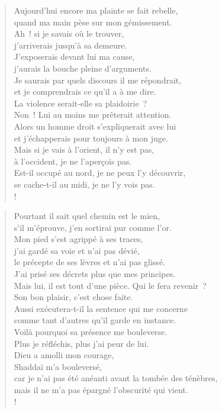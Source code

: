 \documentclass[french,twoside]{book} %
\def\mednobreak{\ifdim\lastskip<\medskipamount
  \removelastskip\nopagebreak\medskip\fi}
\newcommand{\labelblock}[1]{\medbreak{\noindent\color{rubric}\bfseries #1}\par\mednobreak}
\newcommand\chapterclose{} %
\begin{document}
\begin{verse}
Aujourd’hui encore ma plainte se fait rebelle, \\
quand ma main pèse sur mon gémissement.\\
Ah ! si je savais où le trouver, \\
j’arriverais jusqu’à sa demeure.\\
J’exposerais devant lui ma cause, \\
j’aurais la bouche pleine d’arguments.\\
Je saurais par quels discours il me répondrait, \\
et je comprendrais ce qu’il a à me dire.\\
La violence serait-elle sa plaidoirie ? \\
Non ! Lui au moins me prêterait attention.\\
Alors un homme droit s’expliquerait avec lui \\
et j’échapperais pour toujours à mon juge.\\
Mais si je vais à l’orient, il n’y est pas, \\
à l’occident, je ne l’aperçois pas.\\
Est-il occupé au nord, je ne peux l’y découvrir, \\
se cache-t-il au midi, je ne l’y vois pas.\\!
\end{verse}

\labelblock{Présence de Dieu}


\begin{verse}
Pourtant il sait quel chemin est le mien, \\
s’il m’éprouve, j’en sortirai pur comme l’or.\\
Mon pied s’est agrippé à ses traces, \\
j’ai gardé sa voie et n’ai pas dévié,\\
le précepte de ses lèvres et n’ai pas glissé. \\
J’ai prisé ses décrets plus que mes principes.\\
Mais lui, il est tout d’une pièce. Qui le fera revenir ? \\
Son bon plaisir, c’est chose faite.\\
Aussi exécutera-t-il la sentence qui me concerne \\
comme tant d’autres qu’il garde en instance.\\
Voilà pourquoi sa présence me bouleverse. \\
Plus je réfléchis, plus j’ai peur de lui.\\
Dieu a amolli mon courage, \\
Shaddaï m’a bouleversé,\\
car je n’ai pas été anéanti avant la tombée des ténèbres, \\
mais il ne m’a pas épargné l’obscurité qui vient.\\!
\end{verse}
\chapterclose
\end{document}
